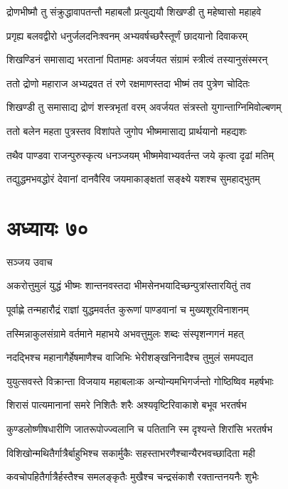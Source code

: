 \twolineshloka
{द्रोणभीष्मौ तु संक्रुद्धावापतन्तौ महाबलौ}
{प्रत्युद्ययौ शिखण्डी तु महेष्वासो महाहवे}


\twolineshloka
{प्रगृह्य बलवद्वीरो धनुर्जलदनिःश्वनम्}
{अभ्यवर्षच्छरैस्तूर्णं छादयानो दिवाकरम्}


\twolineshloka
{शिखण्डिनं समासाद्य भरतानां पितामहः}
{अवर्जयत संग्रामं स्त्रीत्वं तस्यानुसंस्मरन्}


\twolineshloka
{ततो द्रोणो महाराज अभ्यद्रवत तं रणे}
{रक्षमाणस्तदा भीष्मं तव पुत्रेण चोदितः}


\twolineshloka
{शिखण्डी तु समासाद्य द्रोणं शस्त्रभृतां वरम्}
{अवर्जयत संत्रस्तो युगान्ताग्निमिवोल्बणम्}


\twolineshloka
{ततो बलेन महता पुत्रस्तव विशांपते}
{जुगोप भीष्ममासाद्य प्रार्थयानो महद्यशः}


\twolineshloka
{तथैव पाण्डवा राजन्पुरुस्कृत्य धनञ्जयम्}
{भीष्ममेवाभ्यवर्तन्त जये कृत्वा दृढां मतिम्}


\twolineshloka
{तद्युद्धमभवद्धोरं देवानां दानवैरिव}
{जयमाकाङ्क्षतां सङ्क्ष्ये यशश्च सुमहाद्भुतम्}


\chapter{अध्यायः ७०}
\twolineshloka
{सञ्जय उवाच}
{}


\twolineshloka
{अकरोत्तुमुलं युद्धं भीष्मः शान्तनवस्तदा}
{भीमसेनभयादिच्छन्पुत्रांस्तारयितुं तव}


\twolineshloka
{पूर्वाह्णे तन्महारौद्रं राज्ञां युद्धमवर्तत}
{कुरूणां पाण्डवानां च मुख्यशूरविनाशनम्}


\twolineshloka
{तस्मिन्नाकुलसंग्रामे वर्तमाने महाभये}
{अभवत्तुमुलः शब्दः संस्पृशन्गगनं महत्}


\twolineshloka
{नदद्भिश्च महानागैर्हेषमाणैश्च वाजिभिः}
{भेरीशङ्खनिनादैश्च तुमुलं समपद्यत}


\twolineshloka
{युयुत्सवस्ते विक्रान्ता विजयाय महाबलाःक}
{अन्योन्यमभिगर्जन्तो गोष्ठिष्विव महर्षभाः}


\twolineshloka
{शिरासं पात्यमानानां समरे निशितैः शरैः}
{अश्यवृष्टिरिवाकाशे बभूव भरतर्षभ}


\twolineshloka
{कुण्डलोष्णीषधारीणि जातरूपोज्ज्वलानि च}
{पतितानि स्म दृश्यन्ते शिरांसि भरतर्षभ}


\twolineshloka
{विशिखोन्मथितैर्गात्रैर्बाहुभिश्च सकार्मुकैः}
{सहस्ताभरणैश्चान्यैरभवच्छादिता मही}


\twolineshloka
{कवचोपहितैर्गात्रैर्हस्तैश्च समलङ्कृतैः}
{मुखैश्च चन्द्रसंकाशै रक्तान्तनयनैः शुभैः}


